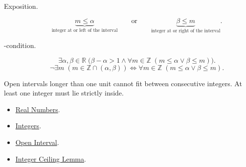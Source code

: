 \begin{remark*}
\begin{description}
  \item[Exposition.]
\[
\underbrace{m\le \alpha}_{\text{integer at or left of the interval}}
\qquad\text{or}\qquad
\underbrace{\beta\le m}_{\text{integer at or right of the interval}}.
\]


  \item[\exists-condition.]
  \[
\exists \alpha,\beta\in\mathbb{R}\;
\bigl(\beta-\alpha>1\land
\forall m\in\mathbb{Z}\;(m\le \alpha\lor \beta\le m)\bigr).
\]
\[
\neg\exists m\;(m\in\mathbb{Z}\cap(\alpha,\beta))
\Longleftrightarrow
\forall m\in\mathbb{Z}\;(m\le \alpha\lor \beta\le m).
\]
\end{description}
\end{remark*}

\begin{remark*}[Interpretation]
Open intervals longer than one unit cannot fit between consecutive integers.
At least one integer must lie strictly inside.
\end{remark*}

\begin{dependencies}
\begin{itemize}
\item \hyperref[def:reals]{Real Numbers}.
\item \hyperref[def:integers]{Integers}.
\item \hyperref[def:open-interval]{Open Interval}.
\item \hyperref[lem:integer-ceiling-lemma]{Integer Ceiling Lemma}.
\end{itemize}
\end{dependencies}
